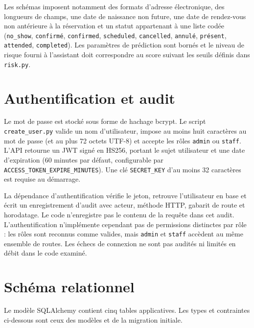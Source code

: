\documentclass[11pt,a4paper]{report}
\newcommand{\code}[1]{\texttt{#1}}
\begin{document}
Les schémas imposent notamment des formats d'adresse électronique, des
longueurs de champs, une date de naissance non future, une date de rendez-vous
non antérieure à la réservation et un statut appartenant à une liste codée
(\code{no\_show}, \code{confirmé}, \code{confirmed}, \code{scheduled},
\code{cancelled}, \code{annulé}, \code{présent}, \code{attended},
\code{completed}). Les paramètres de prédiction sont bornés et le niveau de
risque fourni à l'assistant doit correspondre au score suivant les seuils
définis dans \code{risk.py}.

\section{Authentification et audit}
Le mot de passe est stocké sous forme de hachage bcrypt. Le script
\code{create\_user.py} valide un nom d'utilisateur, impose au moins huit
caractères au mot de passe (et au plus 72 octets UTF-8) et accepte les rôles
\code{admin} ou \code{staff}. L'API retourne un JWT signé en HS256, portant le
sujet utilisateur et une date d'expiration (60 minutes par défaut, configurable
par \code{ACCESS\_TOKEN\_EXPIRE\_MINUTES}). Une clé \code{SECRET\_KEY} d'au
moins 32 caractères est requise au démarrage.

La dépendance d'authentification vérifie le jeton, retrouve l'utilisateur en
base et écrit un enregistrement d'audit avec acteur, méthode HTTP, gabarit de
route et horodatage. Le code n'enregistre pas le contenu de la requête dans
cet audit. L'authentification n'implémente cependant pas de permissions
distinctes par rôle : les rôles sont reconnus comme valides, mais
\code{admin} et \code{staff} accèdent au même ensemble de routes. Les échecs
de connexion ne sont pas audités ni limités en débit dans le code examiné.

\section{Schéma relationnel}
Le modèle SQLAlchemy contient cinq tables applicatives. Les types et
contraintes ci-dessous sont ceux des modèles et de la migration initiale.
\end{document}
